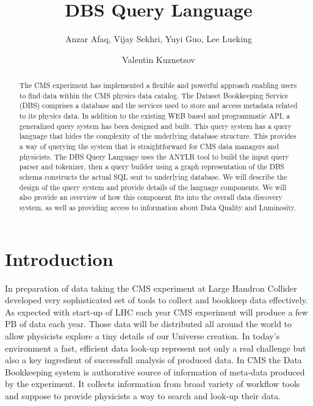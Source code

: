 \documentclass[a4paper]{jpconf}
\begin{document}
\title{DBS Query Language}

\author{Anzar Afaq, Vijay Sekhri, Yuyi Guo, Lee Lueking}
\address{Fermilab, Batavia, Illinois, USA}

\author{Valentin Kuznetsov}
\address{Cornell University, Ithaca, NY 14853, USA}

\begin{abstract}
The CMS experiment has implemented a flexible and 
powerful approach enabling users to find data within 
the CMS physics data catalog. The Dataset Bookkeeping 
Service (DBS) comprises a database and the services 
used to store and access metadata related to its physics 
data. In addition to the existing WEB based and programmatic 
API, a generalized query system has been designed and built. 
This query system has a query language that hides the 
complexity of the underlying database structure. This provides 
a way of querying the system that is straightforward for 
CMS data managers and physicists. The DBS Query Language 
uses the ANTLR tool to build the input query parser and tokenizer, 
then a query builder using a graph representation of the 
DBS schema constructs the actual SQL sent to underlying database. 
We will describe the design of the query system and provide 
details of the language components. We will also provide an 
overview of how this component fits into the overall data 
discovery system, as well as providing access to information 
about Data Quality and Luminosity.
\end{abstract}

\section{Introduction}
In preparation of data taking the CMS experiment at Large
Handron Collider developed very sophisticated set of tools
to collect and bookkeep data effectively. As expected with
start-up of LHC each year CMS experiment will produce a few
PB of data each year. Those data will be distributed all
around the world to allow physicists explore a tiny
details of our Universe creation. In today's environment
a fast, efficient data look-up represent not only a
real challenge but also a key ingredient of successfull
analysis of produced data. In CMS the Data Bookkeeping
system\cite{DBS} is authorative source of information
of meta-data produced by the experiment. It collects
information from broad variety of workflow tools and suppose
to provide physicists a way to search and look-up their data.
\end{document}
